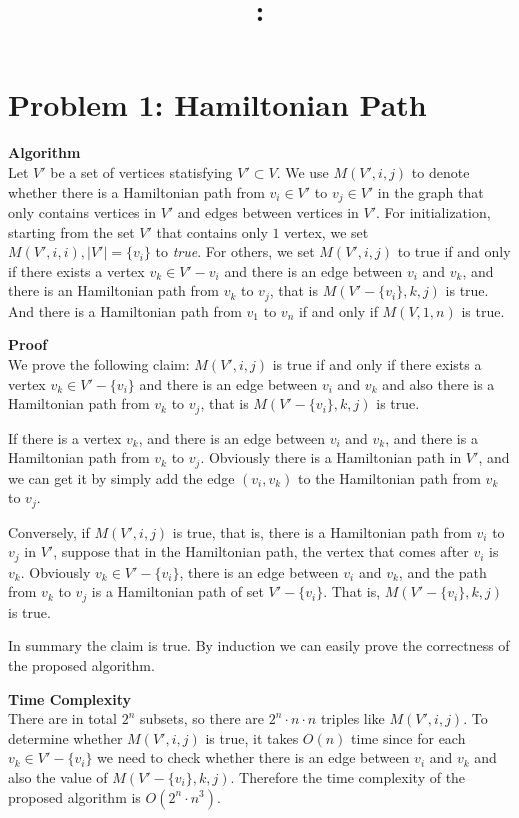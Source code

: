 \documentclass{article}
\title{\textmd{\bf \Class: \Title}}
\date{}
\author{\textbf{\StudentName}}
\newcommand{\Complexity}{\vspace{0.3cm} \noindent\textbf{Time Complexity} \\}
\newcommand{\Proof}{\vspace{0.3cm} \noindent\textbf{Proof} \\}
\newcommand{\Algorithm}{\textbf{Algorithm} \\}
\begin{document}
\maketitle \thispagestyle{empty}
\section*{Problem 1: Hamiltonian Path}
\Algorithm
Let $V'$ be a set of vertices statisfying $V' \subset V$. We use $M(V', i, j)$ to denote whether
there is a Hamiltonian path from $v_i \in V'$ to $v_j \in V'$ in the graph that only contains vertices in $V'$ and
edges between vertices in $V'$. For initialization, starting from the set $V'$ that contains only $1$ vertex, we set 
$M(V', i, i), |V'| = \{v_i\}$ to \textit{true}. For others, we set $M(V', i, j)$ to true if and only if there exists
a vertex $v_k \in V' - {v_i}$ and there is an edge between $v_i$ and $v_k$, and there is an
Hamiltonian path from $v_k$ to $v_j$, that is $M(V' - \{v_i\}, k, j)$ is true.
And there is a Hamiltonian path from $v_1$ to $v_n$ if and
only if $M(V, 1, n)$ is true.  

\Proof
We prove the following claim: $M(V', i, j)$ is true if and only if there exists a vertex $v_k \in 
V' - \{v_i\}$ and there is an edge between $v_i$ and $v_k$ and also there is a Hamiltonian path from
$v_k$ to $v_j$, that is $M(V' - \{v_i\}, k, j)$ is true.  

If there is a vertex $v_k$, and there is an edge between $v_i$ and $v_k$, and there is a Hamiltonian
path from $v_k$ to $v_j$. Obviously there is a Hamiltonian path in $V'$, and we can get it by
simply add the edge $(v_i, v_k)$ to the Hamiltonian path from $v_k$ to $v_j$.   

Conversely, if $M(V', i, j)$ is true, that is, there is a Hamiltonian path from $v_i$ to $v_j$ in
$V'$, suppose that in the Hamiltonian path, the vertex that comes after $v_i$ is $v_k$. Obviously
$v_k \in V' - \{v_i\}$, there is an edge between $v_i$ and $v_k$, and the path from $v_k$ to $v_j$
is a Hamiltonian path of set $V' - \{v_i\}$. That is, $M(V' - \{v_i\}, k, j)$ is true.  

In summary the claim is true. By induction we can easily prove the correctness of the proposed
algorithm.

\Complexity
There are in total $2^n$ subsets, so there are $2^n \cdot n \cdot n$ triples like $M(V', i, j)$.
To determine whether $M(V', i, j)$ is true, it takes $O(n)$ time since for each $v_k \in V' -
\{v_i\}$ we need to check whether there is an edge between $v_i$ and $v_k$ and also the value of 
$M(V' - \{v_i\}, k, j)$. Therefore the time complexity of the proposed algorithm is $O(2^n \cdot
n^3)$.
\end{document}
